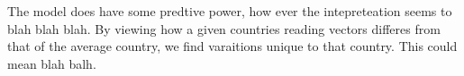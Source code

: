 The model does have some predtive power, how ever the intepreteation seems to blah blah blah. By viewing how a given countries reading vectors differes from that of the average country, we find varaitions unique to that country. This could mean blah balh.

